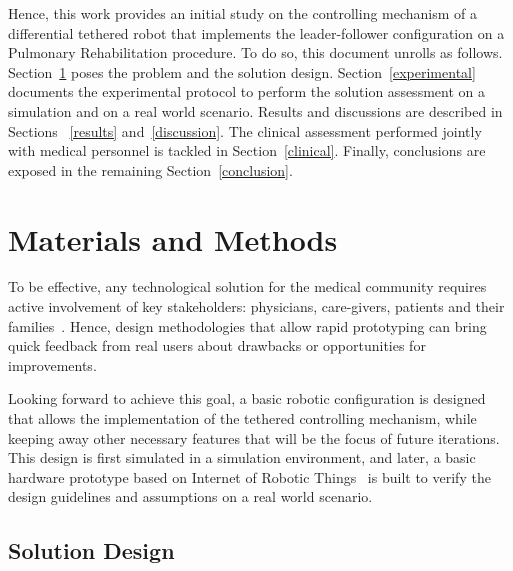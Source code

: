 \documentclass[journal]{IEEEtran}
\begin{document}
Hence, this work provides an initial study on the controlling mechanism of a differential tethered robot that implements the leader-follower configuration on a Pulmonary Rehabilitation procedure.  To do so, this document unrolls as follows.  Section~\ref{materials} poses the problem and the solution design. Section~\ref{experimental} documents the experimental protocol to perform the solution assessment on a simulation and on a real world scenario.  Results and discussions are described in Sections ~\ref{results} and~\ref{discussion}. The clinical assessment performed jointly with medical personnel is tackled in Section~\ref{clinical}.  Finally, conclusions are exposed in the remaining Section~\ref{conclusion}.

\section{Materials and Methods}
\label{materials}


To be effective, any technological solution for the medical community requires active involvement of key stakeholders: physicians, care-givers, patients and their families~\cite{Gaggioli2006,Fasola2012,Cherubini2008,Wolpaw2012BraincomputerIP,Salvini2015}.  Hence, design methodologies that allow rapid prototyping can bring quick feedback from real users about drawbacks or opportunities for improvements. 

Looking forward to achieve this goal, a basic robotic configuration is designed that allows the implementation of the  tethered controlling mechanism, while keeping away other necessary features that will be the focus of future iterations.  This design is first simulated in a simulation environment, and later, a basic hardware prototype based on Internet of Robotic Things~\cite{Simoens2018}  is built to verify the design guidelines and assumptions on a real world scenario.


\subsection{Solution Design}
\end{document}
